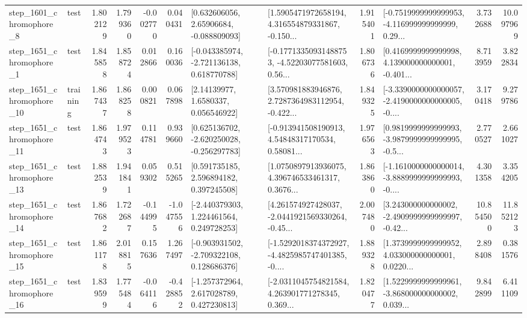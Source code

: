 \begin{tabular}{llrrrrllrlrr}
  step\_1601\_chromophore\_8 &      test &      1.802129 &    1.799360 &     -0.002770 &  0.040431 &     [0.632606056, 2.65906684, -0.088809093] &  [1.5905471972658194, 4.316554879331867, -0.150... &       1.915401 &  [-0.7519999999999953, -4.116999999999999, 0.29... &            3.732688 &         10.097969 \\
  step\_1651\_chromophore\_1 &      test &      1.845858 &    1.858724 &      0.012866 &  0.160036 &   [-0.043385974, -2.721136138, 0.618770788] &  [-0.17713350931488753, -4.52203077581603, 0.56... &       1.806736 &  [0.4169999999999998, 4.139000000000001, -0.401... &            8.713959 &          3.822834 \\
 step\_1651\_chromophore\_10 &  training &      1.867437 &    1.868258 &      0.000821 &  0.067898 &        [2.14139977, 1.6580337, 0.056546922] &  [3.570981883946876, 2.7287364983112954, -0.422... &       1.849325 &  [-3.3390000000000057, -2.4190000000000005, -0.... &            3.170418 &          9.279786 \\
 step\_1651\_chromophore\_11 &      test &      1.864743 &    1.979523 &      0.114781 &  0.939660 &   [0.625136702, -2.620250028, -0.256297783] &  [-0.913941508190913, 4.54848317170534, 0.58081... &       1.976563 &  [0.9819999999999993, -3.9879999999999995, -0.5... &            2.770527 &          2.661027 \\
 step\_1651\_chromophore\_13 &      test &      1.882539 &    1.941841 &      0.059302 &  0.515265 &     [0.591735185, 2.596894182, 0.397245508] &  [1.0750897913936075, 4.396746533461317, 0.3676... &       1.863860 &  [-1.1610000000000014, -3.8889999999999993, -0.... &            4.301358 &          3.354205 \\
 step\_1651\_chromophore\_14 &      test &      1.867682 &    1.722687 &     -0.144995 & -1.047556 &    [-2.440379303, 1.224461564, 0.249728253] &  [4.261574927428037, -2.0441921569330264, -0.45... &       2.007480 &  [3.243000000000002, -2.4909999999999997, -0.42... &           10.854500 &         11.852123 \\
 step\_1651\_chromophore\_15 &      test &      1.861178 &    2.018815 &      0.157636 &  1.267497 &   [-0.903931502, -2.709322108, 0.128686376] &  [-1.5292018374372927, -4.4825985747401385, -0.... &       1.889328 &  [1.3739999999999952, 4.033000000000001, 0.0220... &            2.898408 &          0.381576 \\
 step\_1651\_chromophore\_16 &      test &      1.839599 &    1.775484 &     -0.064116 & -0.428852 &    [-1.257372964, 2.617028789, 0.427230813] &  [-2.0311045754821584, 4.263901771278345, 0.369... &       1.820477 &  [1.5229999999999961, -3.868000000000002, 0.039... &            9.842899 &          6.411109 \\

\end{tabular}

